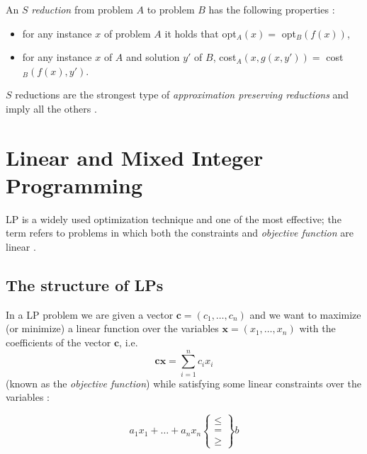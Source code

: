 An $S$ \emph{reduction} from problem $A$ to problem $B$ has the following properties \cite{Crescenzi1997ASG}:
\begin{itemize}
	\item for any instance $x$ of problem $A$ it holds that opt$_{A} (x) = $
	      opt$_{B} (f(x))$,
	\item for any instance $x$ of $A$ and solution $y'$ of $B$, cost$_{A} (x,
		      g(x, y')) = $ cost$_{B} (f(x), y')$.
\end{itemize}

$S$ reductions are the strongest type of \emph{approximation preserving
	reductions} and imply all the others \cite{Crescenzi1997ASG}.

\section{Linear and Mixed Integer Programming}%
\label{sec:linear_and_mixed_integer_programming}

\acrfull{LP} is a widely used optimization technique and one of the most
effective; the term refers to problems in which both the constraints and \emph{objective
	function} are linear
\cite{Edgar2001,Vanderbei2008,Dantzig1998,Martin1998}.

\subsection{The structure of \acrshort{LP}s}%
\label{sub:the_structure_of_a_linear_programming_model}

In a \acrshort{LP} problem we are given a vector $ \mathbf{c} = (c_1,
	\dots, c_n) $ and we want to maximize (or minimize) a linear function over
the variables $ \mathbf{x} = (x_1, \dots, x_n) $ with the coefficients of the
vector $ \mathbf{c} $, i.e.
\begin{equation*}
	\mathbf{cx} = \sum^{n}_{i=1} c_i x_i
\end{equation*}
(known as the \emph{objective function}) while satisfying some linear
constraints over the variables \cite{Bertsimas1997,Vanderbei2008}:

\begin{equation*}
	a_1 x_1 + \dots + a_n x_n \begin{Bmatrix} \leq \\ = \\ \geq \end{Bmatrix} b
\end{equation*}

